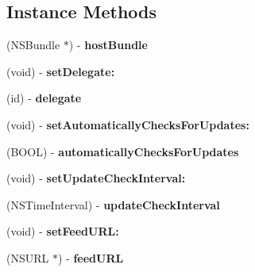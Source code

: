 \subsection*{Instance Methods}
\begin{DoxyCompactItemize}
\item 
\mbox{\label{interface_s_u_updater_a3faf834b08c495d58e81f232baec1402}} 
(N\+S\+Bundle $\ast$) -\/ {\bfseries host\+Bundle}
\item 
\mbox{\label{interface_s_u_updater_ae5ea4c7e9f17e85dc3dfc6f07abceb4e}} 
(void) -\/ {\bfseries set\+Delegate\+:}
\item 
\mbox{\label{interface_s_u_updater_a116a99749681ee2120eaa7abd5d94467}} 
(id) -\/ {\bfseries delegate}
\item 
\mbox{\label{interface_s_u_updater_a4f5761c4bd9357e920c89dd249246f4e}} 
(void) -\/ {\bfseries set\+Automatically\+Checks\+For\+Updates\+:}
\item 
\mbox{\label{interface_s_u_updater_a4bd04a9a76a7843e302cd5439f1a4214}} 
(B\+O\+OL) -\/ {\bfseries automatically\+Checks\+For\+Updates}
\item 
\mbox{\label{interface_s_u_updater_a6ec815c3716bdd1e7d9f611497070765}} 
(void) -\/ {\bfseries set\+Update\+Check\+Interval\+:}
\item 
\mbox{\label{interface_s_u_updater_a6ea74060ff35e0af22350dc8bba0d47b}} 
(N\+S\+Time\+Interval) -\/ {\bfseries update\+Check\+Interval}
\item 
\mbox{\label{interface_s_u_updater_aebf52689edbf7d167facb4bdf7ec4945}} 
(void) -\/ {\bfseries set\+Feed\+U\+R\+L\+:}
\item 
\mbox{\label{interface_s_u_updater_ae6c1445bd69ebb04874f7bef86a869f7}} 
(N\+S\+U\+RL $\ast$) -\/ {\bfseries feed\+U\+RL}
\item 
\mbox{\label{interface_s_u_updater_a0172c3a00dd9f4d1bea7e565f4a0677d}} 

\end{DoxyCompactItemize}

